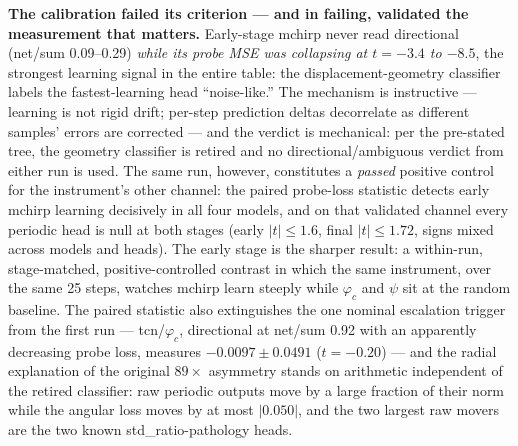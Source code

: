 \textbf{The calibration failed its criterion --- and in failing, validated the measurement that matters.}
Early-stage mchirp never read directional (net/sum 0.09--0.29) \emph{while its probe MSE was collapsing at $t = -3.4$ to $-8.5$}, the strongest learning signal in the entire table: the displacement-geometry classifier labels the fastest-learning head ``noise-like.''
The mechanism is instructive --- learning is not rigid drift; per-step prediction deltas decorrelate as different samples' errors are corrected --- and the verdict is mechanical: per the pre-stated tree, the geometry classifier is retired and no directional/ambiguous verdict from either run is used.
The same run, however, constitutes a \emph{passed} positive control for the instrument's other channel: the paired probe-loss statistic detects early mchirp learning decisively in all four models, and on that validated channel every periodic head is null at both stages (early $|t| \le 1.6$, final $|t| \le 1.72$, signs mixed across models and heads).
The early stage is the sharper result: a within-run, stage-matched, positive-controlled contrast in which the same instrument, over the same 25 steps, watches mchirp learn steeply while $\varphi_c$ and $\psi$ sit at the random baseline.
The paired statistic also extinguishes the one nominal escalation trigger from the first run --- tcn/$\varphi_c$, directional at net/sum 0.92 with an apparently decreasing probe loss, measures $-0.0097 \pm 0.0491$ ($t = -0.20$) --- and the radial explanation of the original $89\times$ asymmetry stands on arithmetic independent of the retired classifier: raw periodic outputs move by a large fraction of their norm while the angular loss moves by at most $|0.050|$, and the two largest raw movers are the two known std\_ratio-pathology heads.

